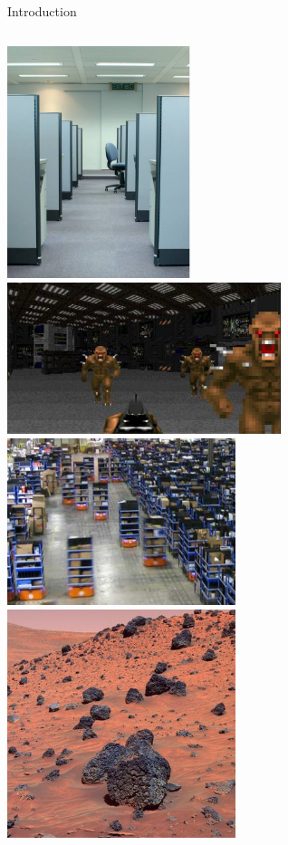 \documentclass{beamer}
\begin{document}
\begin{frame}{Introduction}
\begin{columns}[l c]
			\includegraphics[width=0.4\textwidth]{cubicles.jpg}
			\includegraphics[width=0.6\textwidth]{doom.jpg}
			\\
			\includegraphics[width=0.5\textwidth]{kiva.png}
			\includegraphics[width=0.5\textwidth]{mars.jpg}

	\end{columns}
	\end{frame}
\end{document}

